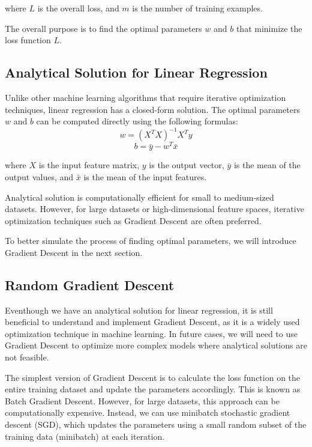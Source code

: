 where \(L\) is the overall loss, and \(m\) is the number of training examples.

The overall purpose is to find the optimal parameters \(w\) and \(b\) that minimize the loss function \(L\).

\subsection{Analytical Solution for Linear Regression}

Unlike other machine learning algorithms that require iterative optimization techniques, linear regression has a closed-form solution. The optimal parameters \(w\) and \(b\) can be computed directly using the following formulas:
\[
w = (X^T X)^{-1} X^T y
\]
\[
b = \bar{y} - w^T \bar{x}
\]

where \(X\) is the input feature matrix, \(y\) is the output vector, \(\bar{y}\) is the mean of the output values, and \(\bar{x}\) is the mean of the input features.

Analytical solution is computationally efficient for small to medium-sized datasets. However, for large datasets or high-dimensional feature spaces, iterative optimization techniques such as Gradient Descent are often preferred.

To better simulate the process of finding optimal parameters, we will introduce Gradient Descent in the next section.

\subsection{Random Gradient Descent}

Eventhough we have an analytical solution for linear regression, it is still beneficial to understand and implement Gradient Descent, as it is a widely used optimization technique in machine learning. In future cases, we will need to use Gradient Descent to optimize more complex models where analytical solutions are not feasible.

The simplest version of Gradient Descent is to calculate the loss function on the entire training dataset and update the parameters accordingly. This is known as Batch Gradient Descent. However, for large datasets, this approach can be computationally expensive. Instead, we can use minibatch stochastic gradient descent (SGD), which updates the parameters using a small random subset of the training data (minibatch) at each iteration.

